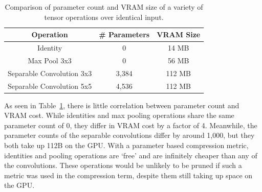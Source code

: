 \begin{table}[h]
\begin{center}
\begin{tabular}{c|c|c}
Operation & \# Parameters & VRAM Size\\
\hline
Identity					& 0 & 14 MB\\
Max Pool 3x3				& 0 & 56 MB\\
Separable Convolution 3x3   & 3,384 & 112 MB\\
Separable Convolution 5x5   & 4,536 & 112 MB\\
\end{tabular}
\end{center}
\caption[Comparison of parameter count and VRAM size in megabytes of various tensor operations over identical input]{Comparison of parameter count and VRAM size of a variety of tensor operations over identical input.}
\label{tab:opcosts}
\end{table}
As seen in Table~\ref{tab:opcosts}, there is little correlation between parameter count and VRAM cost. While identities
and max pooling operations share the same parameter count of 0, they differ in VRAM cost by a factor of 4. Meanwhile, the
parameter counts of the separable convolutions differ by around 1,000, but they both take up 112B on the GPU. With a
parameter based compression metric, identities and pooling operations are `free' and are infinitely cheaper than any
of the convolutions. These operations would be unlikely to be pruned if such a metric was used in the compression term,
despite them still taking up space on the GPU.

